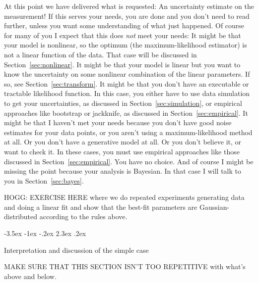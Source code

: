 \documentclass[10pt]{article}
\makeatletter
\newcommand{\sectionname}{Section}
\renewcommand\section{\@startsection {section}{1}{\z@}%
  {-3.5ex \@plus -1ex \@minus -.2ex}%
  {2.3ex \@plus.2ex}%
  {\raggedright\normalfont\Large\bfseries}}
\makeatother
\begin{document}
At this point we have delivered what is requested: An uncertainty estimate
on the measurement!
If this serves your needs, you are done and you don't need to read further,
unless you want some understanding of what just happened.
Of course for many of you I expect that this does \emph{not} meet your needs:
It might be that your model is nonlinear, so the optimum (the maximum-likelihood
estimator) is not a linear function of the data. That case will be discussed
in \sectionname~\ref{sec:nonlinear}.
It might be that your model is linear but you want to know the uncertainty on
some nonlinear combination of the linear parameters.
If so, see \sectionname~\ref{sec:transform}.
It might be that you don't have an executable or tractable likelihood function.
In this case, you either have to use data simulation to get your uncertainties,
as discussed in \sectionname~\ref{sec:simulation}, or empirical approaches
like bootstrap or jackknife, as discussed in \sectionname~\ref{sec:empirical}.
It might be that I haven't met your needs because you don't have good noise
estimates for your data points, or you aren't using a maximum-likelihood method
at all. Or you don't have a generative model at all. Or you don't believe it, or
want to check it. In these cases, you must use empirical approaches like those discussed
in \sectionname~\ref{sec:empirical}. You have no choice.
And of course I might be missing the point because your analysis is Bayesian.
In that case I will talk to you in \sectionname~\ref{sec:bayes}.

HOGG: EXERCISE HERE where we do repeated experiments generating data
and doing a linear fit and show that the best-fit parameters are
Gaussian-distributed according to the rules above.

\section{Interpretation and discussion of the simple case}\label{sec:interp}

MAKE SURE THAT THIS SECTION ISN'T TOO REPETITIVE with what's above and below.
\end{document}

